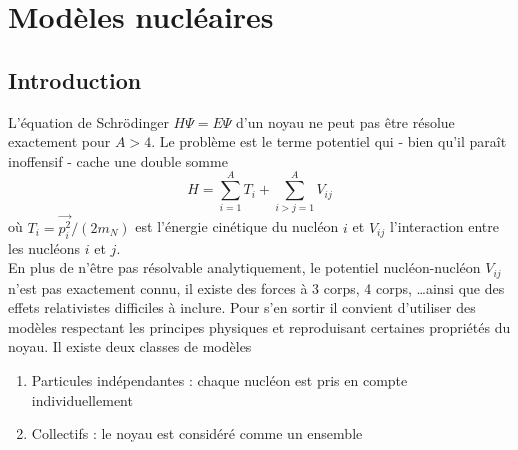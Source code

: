 \chapter{Modèles nucléaires}

\section{Introduction}
L'équation de Schrödinger $H\Psi=E\Psi$ d'un noyau ne peut pas être résolue exactement pour $A>4$. Le problème
est le terme potentiel qui - bien qu'il paraît inoffensif - cache une double somme
\begin{equation}
H=\sum_{i=1}^AT_i+\sum_{i>j=1}^A V_{ij}
\end{equation}
où $T_i=\vec{p_i^2}/(2m_N)$ est l'énergie cinétique du nucléon $i$ et $V_{ij}$ l'interaction entre les nucléons
$i$ et $j$.\\

En plus de n'être pas résolvable analytiquement, le potentiel nucléon-nucléon $V_{ij}$ n'est pas exactement 
connu, il existe des forces à 3 corps, 4 corps, \dots ainsi que des effets relativistes difficiles à inclure. Pour
s'en sortir il convient d'utiliser des modèles respectant les principes physiques et reproduisant certaines
propriétés du noyau. Il existe deux classes de modèles
\begin{enumerate}
\item Particules indépendantes : chaque nucléon est pris en compte individuellement
\item Collectifs : le noyau est considéré comme un ensemble
\end{enumerate}


